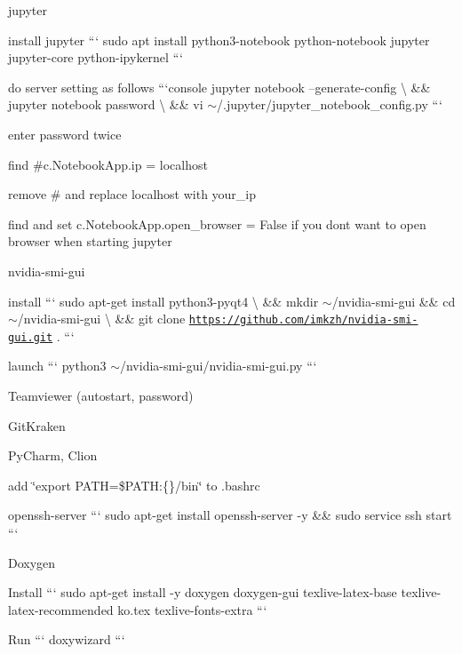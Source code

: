 
\begin{DoxyItemize}
\item jupyter
\begin{DoxyItemize}
\item install jupyter ``` sudo apt install python3-\/notebook python-\/notebook jupyter jupyter-\/core python-\/ipykernel ```
\item do server setting as follows ```console jupyter notebook --generate-\/config \textbackslash{} \&\& jupyter notebook password \textbackslash{} \&\& vi $\sim$/.jupyter/jupyter\+\_\+notebook\+\_\+config.\+py ```
\begin{DoxyItemize}
\item enter password twice
\item find \#c.\+Notebook\+App.\+ip = \textquotesingle{}localhost\textquotesingle{}
\item remove \textquotesingle{}\#\textquotesingle{} and replace \textquotesingle{}localhost\textquotesingle{} with \textquotesingle{}your\+\_\+ip\textquotesingle{}
\item find and set c.\+Notebook\+App.\+open\+\_\+browser = False if you don\textquotesingle{}t want to open browser when starting jupyter
\end{DoxyItemize}
\end{DoxyItemize}
\item nvidia-\/smi-\/gui
\begin{DoxyItemize}
\item install ``` sudo apt-\/get install python3-\/pyqt4 \textbackslash{} \&\& mkdir $\sim$/nvidia-\/smi-\/gui \&\& cd $\sim$/nvidia-\/smi-\/gui \textbackslash{} \&\& git clone \href{https://github.com/imkzh/nvidia-smi-gui.git}{\tt https\+://github.\+com/imkzh/nvidia-\/smi-\/gui.\+git} . ```
\item launch ``` python3 $\sim$/nvidia-\/smi-\/gui/nvidia-\/smi-\/gui.py ```
\end{DoxyItemize}
\item Teamviewer (autostart, password)
\item Git\+Kraken
\item Py\+Charm, Clion
\begin{DoxyItemize}
\item add \char`\"{}export P\+A\+T\+H=\$\+P\+A\+T\+H\+:\{\}/bin\char`\"{} to .bashrc
\end{DoxyItemize}
\item openssh-\/server ``` sudo apt-\/get install openssh-\/server -\/y \&\& sudo service ssh start ```
\item Doxygen
\begin{DoxyItemize}
\item Install ``` sudo apt-\/get install -\/y doxygen doxygen-\/gui texlive-\/latex-\/base texlive-\/latex-\/recommended ko.\+tex texlive-\/fonts-\/extra ```
\item Run ``` doxywizard ```
\end{DoxyItemize}
\end{DoxyItemize}

